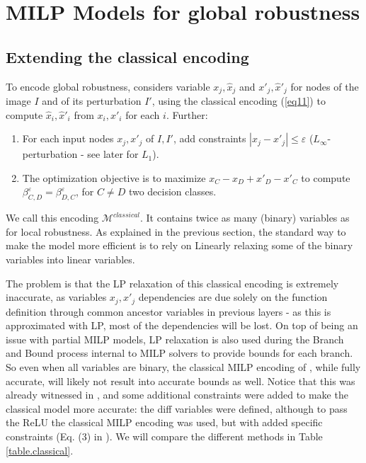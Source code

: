	\section{MILP Models for global robustness}
	
	
	
	\subsection{Extending the classical encoding}
	
    To encode global robustness, \cite{vhagar} considers
	variable $x_j,\hat{x}_j$ and $x'_j,\hat{x}'_j$ for nodes of the image $I$ 
	and of its perturbation $I'$, 
	using the classical encoding (\ref{eq11}) \cite{MILP} 
	to compute $\hat{x}_i, \hat{x}'_i$ from $x_i, x'_i$
	for each $i$.
    Further:
    \begin{enumerate}
		\item For each input nodes $x_j,x'_j$ of $I,I'$, add constraints
        $|x_j-x'_j| \leq \varepsilon$ 
        ($L_\infty$-perturbation - see later for $L_1$).
		\item The optimization objective is to maximize $x_C - x_D +x'_D - x'_C$ 
		to compute $\beta^\varepsilon_{C,D}=\beta^\varepsilon_{D,C}$, 
		for $C \neq D$ two decision classes.
	\end{enumerate}

	We call this encoding $\mathcal{M}^{classical}$.
	It contains twice as many (binary) variables as for local robustness. 
	As explained in the previous section, the standard way to make the model more efficient is to rely on Linearly relaxing some of the binary variables into linear variables.

    The problem is that the LP relaxation of this classical encoding is extremely inaccurate, as variables $x_j,x'_j$ dependencies are due solely on the function definition through common ancestor variables in previous layers - as this is approximated with LP, most of the dependencies will be lost. On top of being an issue with partial MILP models, LP relaxation is also used during the Branch and Bound process internal to MILP solvers to provide bounds for each branch. So even when all variables are binary, the classical MILP encoding 
	of \cite{MILP}, while fully accurate, will likely not result into accurate bounds as well. Notice that this was already witnessed in \cite{ITNE}, and some additional constraints were added to make the classical model more accurate:
	the diff variables were defined, although to pass the ReLU the classical  
	MILP encoding was used, but with added specific constraints (Eq. (3) in 
	\cite{ITNE}). We will compare the different methods in Table \ref{table.classical}.

